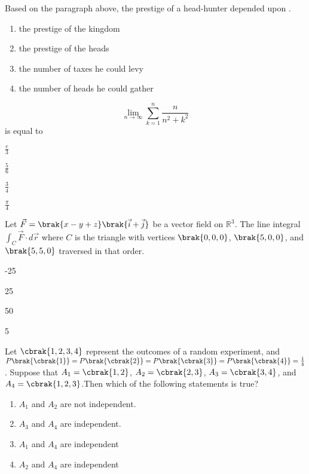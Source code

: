 Based on the paragraph above, the prestige of a head-hunter depended upon .\underline{\hspace{1cm}}
\begin{enumerate}
\item the prestige of the kingdom
\item the prestige of the heads
\item the number of taxes he could levy
\item the number of heads he could gather
\end{enumerate}
\item \[\lim_{n \to \infty} \sum_{k=1}^{n} \frac{n}{n^2 + k^2} \] is equal to
\begin{enumerate}
\begin{multicols}{4}
\item $\frac{e}{3}$
\item $\frac{5}{6}$
\item $\frac{3}{4}$
\item $\frac{\pi}{4}$
\end{multicols}
\end{enumerate}
\item Let $\vec{F} = \brak{x - y + z}\brak{\vec{i} + \vec{j}}$ be a vector field on $\mathbb{R}^3$. The line integral $\int_C \vec{F} \cdot d\vec{r}$ where $C$ is the triangle with vertices $\brak{0,0,0}$, $\brak{5,0,0}$, and $\brak{5,5,0}$ traversed in that order.
\begin{enumerate}
\begin{multicols}{4}
\item -25
\item 25
\item 50
\item 5
\end{multicols}
\end{enumerate}
\item Let $\cbrak{1,2,3,4}$ represent the outcomes of a random experiment, and $P\brak{\cbrak{1}} = P\brak{\cbrak{2}} = P\brak{\cbrak{3}} = P\brak{\cbrak{4}} = \frac{1}{4}$. Suppose that $A_1 = \cbrak{1,2}$, $A_2 = \cbrak{2,3}$, $A_3 = \cbrak{3,4}$, and $A_4 = \cbrak{1,2,3}$.Then which of the following statements is true?
\begin{enumerate}
\item $A_1$ and $A_2$ are not independent.
\item $A_3$ and $A_4$ are independent.
\item $A_1$ and $A_4$ are independent
\item $A_2$ and $A_4$ are independent
\end{enumerate}
